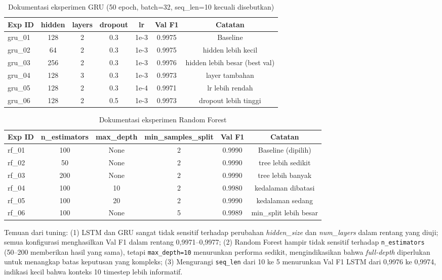 \documentclass[11pt,a4paper,oneside]{report}
\begin{document}
\begin{table}[h!]
\centering
\caption{Dokumentasi eksperimen GRU (50 epoch, batch=32, seq\_len=10 kecuali disebutkan)}
\label{tab:gru-tuning}
\begin{tabular}{lcccccc}
\toprule
\textbf{Exp ID} & \textbf{hidden} & \textbf{layers} & \textbf{dropout} & \textbf{lr} & \textbf{Val F1} & \textbf{Catatan} \\
\midrule
gru\_01 & 128 & 2 & 0.3 & 1e-3 & 0.9975 & Baseline \\
gru\_02 & 64  & 2 & 0.3 & 1e-3 & 0.9975 & hidden lebih kecil \\
gru\_03 & 256 & 2 & 0.3 & 1e-3 & 0.9976 & hidden lebih besar (best val) \\
gru\_04 & 128 & 3 & 0.3 & 1e-3 & 0.9973 & layer tambahan \\
gru\_05 & 128 & 2 & 0.3 & 1e-4 & 0.9971 & lr lebih rendah \\
gru\_06 & 128 & 2 & 0.5 & 1e-3 & 0.9973 & dropout lebih tinggi \\
\bottomrule
\end{tabular}
\end{table}

\begin{table}[h!]
\centering
\caption{Dokumentasi eksperimen Random Forest}
\label{tab:rf-tuning}
\begin{tabular}{lccccc}
\toprule
\textbf{Exp ID} & \textbf{n\_estimators} & \textbf{max\_depth} & \textbf{min\_samples\_split} & \textbf{Val F1} & \textbf{Catatan} \\
\midrule
rf\_01 & 100 & None & 2 & 0.9990 & Baseline (dipilih) \\
rf\_02 & 50  & None & 2 & 0.9990 & tree lebih sedikit \\
rf\_03 & 200 & None & 2 & 0.9990 & tree lebih banyak \\
rf\_04 & 100 & 10   & 2 & 0.9980 & kedalaman dibatasi \\
rf\_05 & 100 & 20   & 2 & 0.9990 & kedalaman sedang \\
rf\_06 & 100 & None & 5 & 0.9989 & min\_split lebih besar \\
\bottomrule
\end{tabular}
\end{table}

Temuan dari tuning: (1) LSTM dan GRU sangat tidak sensitif terhadap perubahan \textit{hidden\_size} dan \textit{num\_layers} dalam rentang yang diuji; semua konfigurasi menghasilkan Val F1 dalam rentang 0,9971--0,9977; (2) Random Forest hampir tidak sensitif terhadap \texttt{n\_estimators} (50--200 memberikan hasil yang sama), tetapi \texttt{max\_depth=10} menurunkan performa sedikit, mengindikasikan bahwa \textit{full-depth} diperlukan untuk menangkap batas keputusan yang kompleks; (3) Mengurangi \texttt{seq\_len} dari 10 ke 5 menurunkan Val F1 LSTM dari 0,9976 ke 0,9974, indikasi kecil bahwa konteks 10 timestep lebih informatif.
\end{document}
